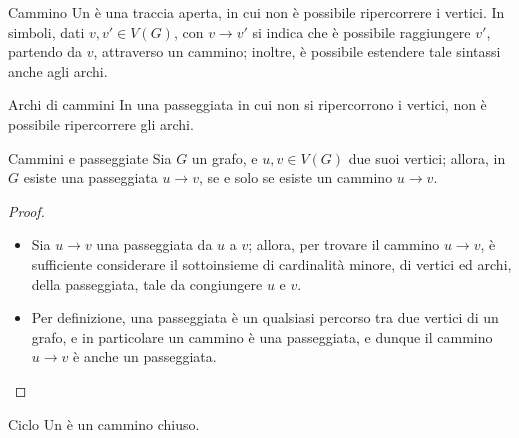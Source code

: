 \documentclass[a4paper, 12pt]{report}
\begin{document}
    \begin{frameddefn}{Cammino}
        Un  è una traccia aperta, in cui non è possibile ripercorrere i vertici. In simboli, dati $v, v' \in V(G)$, con $v \rightarrow v'$ si indica che è possibile raggiungere $v'$, partendo da $v$, attraverso un cammino; inoltre, è possibile estendere tale sintassi anche agli archi.
    \end{frameddefn}

    \begin{framedobs}{Archi di cammini}
        In una passeggiata in cui non si ripercorrono i vertici, non è possibile ripercorrere gli archi.
    \end{framedobs}

    \begin{framedthm}[label={cammini e passeggiate}]{Cammini e passeggiate}
        Sia $G$ un grafo, e $u, v \in V(G)$ due suoi vertici; allora, in $G$ esiste una passeggiata $u \rightarrow v$, se e solo se esiste un cammino $u \rightarrow v$.
    \end{framedthm}

    \begin{proof}
        \hspace{0.7cm}
        \begin{itemize}
            \item[]  Sia $u \rightarrow v$ una passeggiata da $u$ a $v$; allora, per trovare il cammino $u \rightarrow v$, è sufficiente considerare il sottoinsieme di cardinalità minore, di vertici ed archi, della passeggiata, tale da congiungere $u$ e $v$.
            \item[]  Per definizione, una passeggiata è un qualsiasi percorso tra due vertici di un grafo, e in particolare un cammino è una passeggiata, e dunque il cammino $u \rightarrow v$ è anche un passeggiata.
        \end{itemize}
    \end{proof}

    \begin{frameddefn}{Ciclo}
        Un  è un cammino chiuso.
    \end{frameddefn}
\end{document}
